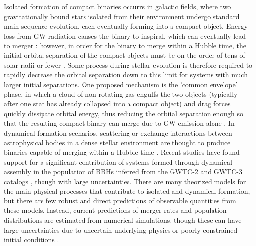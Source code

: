 Isolated formation of compact binaries occurrs in galactic fields, where two gravitationally bound stars isolated from their environment undergo standard main sequence evolution, each eventually forming into a compact object. Energy loss from GW radiation causes the binary to inspiral, which can eventually lead to merger \citep{10.1051/0004-6361/201936204}; however, in order for the binary to merge within a Hubble time, the initial orbital separation of the compact objects must be on the order of tens of solar radii or fewer . Some process during stellar evolution is therefore required to rapidly decrease the orbital separation down to this limit for systems with much larger initial separations. One proposed mechanism is the 'common envelope' phase, in which a cloud of non-rotating gas engulfs the two objects (typically after one star has already collapsed into a compact object) and drag forces quickly dissipate orbital energy, thus reducing the orbital separation enough so that the resulting compact binary can merge due to GW emission alone \citep{10.1038/nature18322}. In dynamical formation scenarios, scattering or exchange interactions between astrophysical bodies in a dense stellar environment are thought to produce binaries capable of merging within a Hubble time \citep{1602.02444}. Recent studies have found support for a significant contribution of systems formed through dynamical assembly in the population of BBHs inferred from the GWTC-2 and GWTC-3 catalogs \citep{2021ApJ...913L...7A,2021PhRvD.104h3010R,2021arXiv211103634T,2022ApJ...937L..13C,2021ApJ...921L..15G,2022arXiv220902206T,2022arXiv220906978V,2022arXiv221012834E}, though with large uncertainties. There are many theorized models for the main physical processes that contribute to isolated and dynamical formation, but there are few robust and direct predictions of observable quantities from these models. Instead, current predictions of merger rates and population distributions are estimated from numerical simulations, though these can have large uncertainties due to uncertain underlying physics or poorly constrained initial conditions \citep{10.1007/s41114-021-00034-3, 10.1051/0004-6361/201936204, 1806.00001v3, 1308.1546}. 

